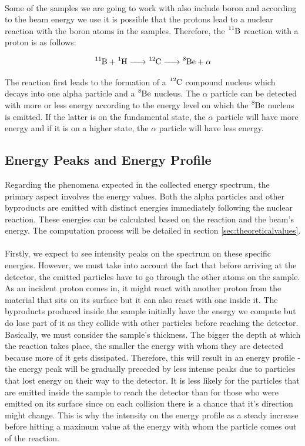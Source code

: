 \documentclass{article}
\begin{document}
\begin{multicols}{2}
\paragraph{} Some of the samples we are going to work with also include boron and according to the beam energy we use it is possible that the protons lead to a nuclear reaction with the boron atoms in the samples. Therefore, the $\ce{^{11}B}$ reaction with a proton is as follows:

\begin{equation}
  \ce{ ^{11}B + ^1H -> ^{12}C -> ^8Be + \alpha}
\label{eq:reactionB}
\end{equation}

The reaction first leads to the formation of a $\ce{^{12}C}$ compound nucleus which decays into one alpha particle and a $\ce{^8Be}$ nucleus. The $\alpha$ particle can be detected with more or less energy according to the energy level on which the $\ce{^8Be}$ nucleus is emitted. If the latter is on the fundamental state, the $\alpha$ particle will have more energy and if it is on a higher state, the $\alpha$ particle will have less energy.

\subsection{Energy Peaks and Energy Profile}
    \label{sec:energy_profile_peak}

Regarding the phenomena expected in the collected energy spectrum, the primary aspect involves the energy values. Both the alpha particles and other byproducts are emitted with distinct energies immediately following the nuclear reaction. These energies can be calculated based on the reaction and the beam's energy. The computation process will be detailed in section \ref{sec:theoreticalvalues}.
\paragraph{}
Firstly, we expect to see intensity peaks on the spectrum on these specific energies. However, we must take into account the fact that before arriving at the detector, the emitted particles have to go through the other atoms on the sample. As an incident proton comes in, it might react with another proton from the material that sits on its surface but it can also react with one inside it. The byproducts produced inside the sample initially have the energy we compute but do lose part of it as they collide with other particles before reaching the detector. Basically, we must consider the sample's thickness. The bigger the depth at which the reaction takes place, the smaller the energy with whom they are detected because more of it gets dissipated.
Therefore, this will result in an energy profile - the energy peak will be gradually preceded by less intense peaks due to particles that lost energy on their way to the detector. It is less likely for the particles that are emitted inside the sample to reach the detector than for those who were emitted on its surface since on each collision there is a chance that it's direction might change. This is why the intensity on the energy profile as a steady increase before hitting a maximum value at the energy with whom the particle comes out of the reaction.

\end{multicols}
\end{document}
